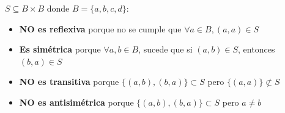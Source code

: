 \documentclass[11pt,letterpaper]{article}
\begin{document}
\begin{enumerate}
        $S \subseteq B \times B$ donde $B = \{a, b, c, d\}$:
        \begin{itemize}
            \item \textbf{NO es reflexiva} porque no se cumple que $\forall a \in B, (a, a) \in S$
            \item \textbf{Es simétrica} porque $\forall a, b \in B$, sucede que si $(a, b) \in S$, entonces $(b, a) \in S$
            \item \textbf{NO es transitiva} porque $\{(a, b), (b, a)\} \subset S$ pero $\{(a, a)\} \not\subset S$
            \item \textbf{NO es antisimétrica} porque $\{(a, b), (b, a)\} \subset S$ pero $a \neq b$
        \end{itemize}

\end{enumerate}
\end{document}
